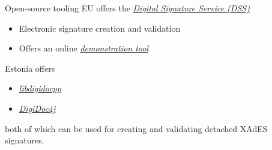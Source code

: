 \begin{frame}{Open-source tooling}
  EU offers the \href{https://ec.europa.eu/digital-building-blocks/sites/spaces/DIGITAL/pages/467109107/Digital+Signature+Service+-+DSS}{\textit{Digital Signature Service (DSS)}}
  \begin{itemize}
    \item Electronic signature creation and validation
    \item Offers an online \href{https://ec.europa.eu/digital-building-blocks/DSS/webapp-demo/}{\textit{demonstration tool}}
  \end{itemize}

  \vspace*{1em}

  \pause
  Estonia offers
  \begin{itemize}
    \item \href{https://github.com/open-eid/libdigidocpp}{\textit{libdigidocpp}}
    \item \href{https://github.com/open-eid/digidoc4j}{\textit{DigiDoc4j}}
  \end{itemize}
  both of which can be used for creating and validating detached XAdES signatures.
\end{frame}


